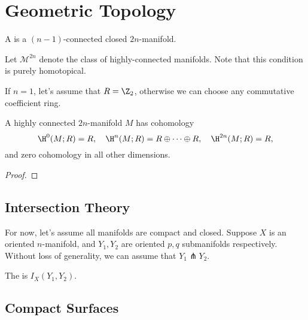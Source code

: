 \providecommand{\HC}{\mathcal{M}}

\chapter{Geometric Topology}


\begin{definition}
  A  is a $(n-1)$-connected closed $2n$-manifold.
\end{definition}

Let $\HC^{2n}$ denote the class of highly-connected manifolds. Note that this condition is purely homotopical.

If $n=1$, let's assume that $R=\Z_2$, otherwise we can choose any commutative coefficient ring.
\begin{proposition}
	A highly connected $2n$-manifold $M$ has cohomology
	\[
		\H^0(M; R) = R,\quad \H^n(M; R) = R\oplus \cdots \oplus R,\quad \H^{2n}(M; R)=R,
	\]
	and zero cohomology in all other dimensions.
\end{proposition}

\begin{proof}
\end{proof}


\section{Intersection Theory}


For now, let's assume all manifolds are compact and closed.
Suppose $X$ is an oriented $n$-manifold, and $Y_1, Y_2$ are oriented $p,q$ submanifolds respectively.
Without loss of generality, we can assume that $Y_1\pitchfork Y_2$.

\begin{definition}
  The  is $I_X(Y_1, Y_2)$.
\end{definition}

\begin{definition}
\end{definition}

\section{Compact Surfaces}

